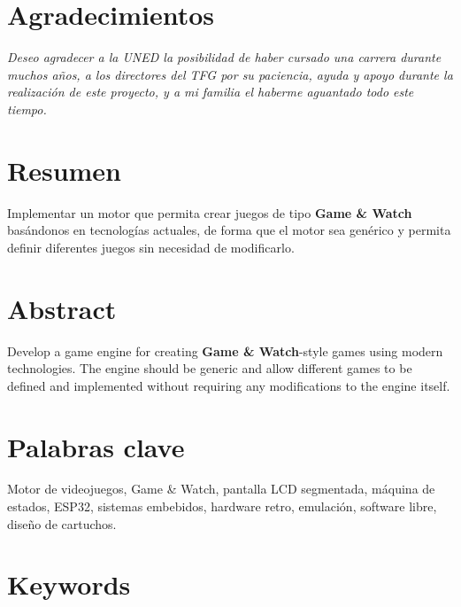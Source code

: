 \documentclass[12pt,twoside]{book}
\begin{document}

\chapter*{Agradecimientos}
\thispagestyle{empty}
\begin{flushright}
\textit{Deseo agradecer a la UNED la posibilidad de haber cursado una carrera durante muchos años,
	a los directores del TFG por su paciencia, ayuda y apoyo durante la realización de este proyecto,
	y a mi familia el haberme aguantado todo este tiempo.}
\end{flushright}

\chapter*{Resumen} %

Implementar un motor que permita crear juegos de tipo \textbf{Game \& Watch} basándonos en tecnologías actuales, de forma que el motor sea genérico y permita definir diferentes juegos sin necesidad de modificarlo.

\chapter*{Abstract} %

Develop a game engine for creating \textbf{Game \& Watch}-style games using modern technologies. The engine should be generic and allow different games to be defined and implemented without requiring any modifications to the engine itself.

\chapter*{Palabras clave} %

Motor de videojuegos, Game \& Watch, pantalla LCD segmentada, máquina de estados, ESP32, sistemas embebidos, hardware retro, emulación, software libre, diseño de cartuchos.


\chapter*{Keywords} %
\end{document}
